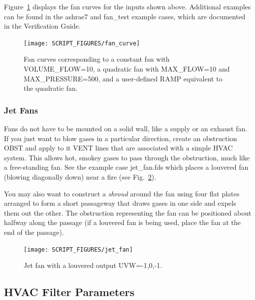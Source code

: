 \documentclass[11pt]{book}
\begin{document}
Figure~\ref{fig:Fan_Curve} displays the fan curves for the inputs shown above.  Additional examples can be found in the {\ct ashrae7} and {\ct fan\_test} example cases, which are documented in the Verification Guide.

\begin{figure}[ht!]
\begin{center}
\texttt{[image: SCRIPT\_FIGURES/fan\_curve]}
\caption[Example of fan curves]{Fan curves corresponding to a constant fan with {\ct VOLUME\_FLOW=10}, a quadratic fan with {\ct MAX\_FLOW=10} and {\ct MAX\_PRESSURE=500}, and a user-defined {\ct RAMP} equivalent to the quadratic fan.}
\label{fig:Fan_Curve}
\end{center}
\end{figure}

\subsubsection{Jet Fans}

Fans do not have to be mounted on a solid wall, like a supply or an exhaust fan.
If you just want to blow gases in a particular direction, create an
obstruction {\ct OBST} and apply to it {\ct VENT} lines that are
associated with a simple HVAC system.
This allows hot, smokey gases to pass through the
obstruction, much like a free-standing fan.  See the example case {\ct jet\_fan.fds} which places a louvered fan (blowing diagonally down) near a fire (see Fig.~\ref{fig:Jet_Fan}).

You may also want to construct a {\em shroud} around the fan using four flat plates arranged to form
a short passageway that draws gases in one side and expels them out the other. The obstruction representing the fan can be positioned about halfway along the passage (if a louvered fan is being used, place the fan at the end of the passage).

\begin{figure}[ht!]
\begin{center}
\texttt{[image: SCRIPT\_FIGURES/jet\_fan]}
\caption[Example of a jet fan]{Jet fan with a louvered output {\ct UVW=-1,0,-1}.}
\label{fig:Jet_Fan}
\end{center}
\end{figure}


\subsection{HVAC Filter Parameters}
\label{info:HVACfilter}
\end{document}
